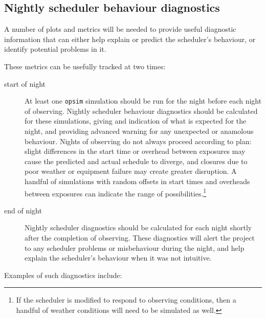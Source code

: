 \subsection{Nightly scheduler behaviour diagnostics}
\label{sec:orged267d1}
A number of plots and metrics will be needed to provide useful diagnostic information that can either help explain or predict the scheduler's behaviour, or identify potential problems in it.

These metrics can be usefully tracked at two times:
\begin{description}
\item[{start of night}] At least one \texttt{opsim} simulation should be run for the night before each night of observing. Nightly scheduler behaviour diagnostics should be calculated for these simulations, giving and indication of what is expected for the night, and providing advanced warning for any unexpected or anamolous behaviour. Nights of observing do not always proceed according to plan: slight differences in the start time or overhead between exposures may cause the predicted and actual schedule to diverge, and closures due to poor weather or equipment failure may create greater disruption. A handful of simulations with random offsets in start times and overheads between exposures can indicate the range of possibilities.\footnote{If the scheduler is modified to respond to observing conditions, then a handful of weather conditions will need to be simulated as well.}
\item[{end of night}] Nightly scheduler diagnostics should be calculated for each night shortly after the completion of observing. These diagnostics will alert the project to any scheduler problems or misbehaviour during the night, and help explain the scheduler's behaviour when it was not intuitive.
\end{description}

Examples of such diagnostics include:

